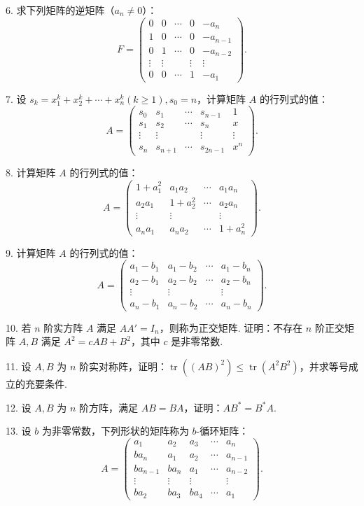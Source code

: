 \documentclass[UTF8,12pt,a4paper,fontset=fandol]{ctexart}
\begin{document}
6. 求下列矩阵的逆矩阵（$a_n\ne0$）：
\[
F=
\left(
\begin{array}{ccccc}
0 & 0 & \cdots & 0 & -a_n\\
1 & 0 & \cdots & 0 & -a_{n-1}\\
0 & 1 & \cdots & 0 & -a_{n-2}\\
\vdots & \vdots & & \vdots & \vdots\\
0 & 0 & \cdots & 1 & -a_1
\end{array}
\right).
\]

7. 设 $s_k=x_1^k+x_2^k+\cdots+x_n^k(k\ge1),s_0=n$，计算矩阵 $A$ 的行列式的值：
\[
A=
\left(
\begin{array}{ccccc}
s_0 & s_1 & \cdots & s_{n-1} & 1\\
s_1 & s_2 & \cdots & s_n & x\\
\vdots & \vdots & & \vdots & \vdots\\
s_n & s_{n+1} & \cdots & s_{2n-1} & x^n
\end{array}
\right).
\]

8. 计算矩阵 $A$ 的行列式的值：
\[
A=
\left(
\begin{array}{cccc}
1+a_1^2 & a_1a_2 & \cdots & a_1a_n\\
a_2a_1 & 1+a_2^2 & \cdots & a_2a_n\\
\vdots & \vdots & & \vdots\\
a_na_1 & a_na_2 & \cdots & 1+a_n^2
\end{array}
\right).
\]

9. 计算矩阵 $A$ 的行列式的值：
\[
A=
\left(
\begin{array}{cccc}
a_1-b_1 & a_1-b_2 & \cdots & a_1-b_n\\
a_2-b_1 & a_2-b_2 & \cdots & a_2-b_n\\
\vdots & \vdots & & \vdots\\
a_n-b_1 & a_n-b_2 & \cdots & a_n-b_n
\end{array}
\right).
\]

10. 若 $n$ 阶实方阵 $A$ 满足 $AA'=I_n$，则称为正交矩阵. 证明：不存在 $n$ 阶正交矩阵 $A,B$ 满足 $A^2=cAB+B^2$，其中 $c$ 是非零常数.

11. 设 $A,B$ 为 $n$ 阶实对称阵，证明：$\operatorname{tr}((AB)^2)\le\operatorname{tr}(A^2B^2)$，并求等号成立的充要条件.

12. 设 $A,B$ 为 $n$ 阶方阵，满足 $AB=BA$，证明：$AB^*=B^*A$.

13. 设 $b$ 为非零常数，下列形状的矩阵称为 $b$-循环矩阵：
\[
A=
\left(
\begin{array}{ccccc}
a_1 & a_2 & a_3 & \cdots & a_n\\
ba_n & a_1 & a_2 & \cdots & a_{n-1}\\
ba_{n-1} & ba_n & a_1 & \cdots & a_{n-2}\\
\vdots & \vdots & \vdots & & \vdots\\
ba_2 & ba_3 & ba_4 & \cdots & a_1
\end{array}
\right).
\]
\end{document}
